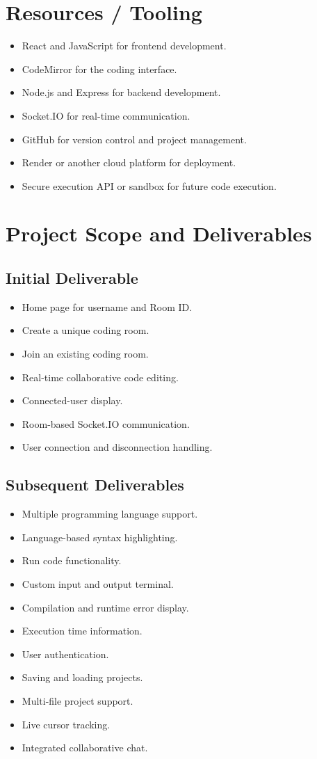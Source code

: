 \documentclass[11pt,letterpaper]{article}
\begin{document}
\section{Resources / Tooling}
\begin{itemize}
\item React and JavaScript for frontend development.
\item CodeMirror for the coding interface.
\item Node.js and Express for backend development.
\item Socket.IO for real-time communication.
\item GitHub for version control and project management.
\item Render or another cloud platform for deployment.
\item Secure execution API or sandbox for future code execution.
\end{itemize}


\section{Project Scope and Deliverables}
\subsection{Initial Deliverable}
\begin{itemize}
\item Home page for username and Room ID.
\item Create a unique coding room.
\item Join an existing coding room.
\item Real-time collaborative code editing.
\item Connected-user display.
\item Room-based Socket.IO communication.
\item User connection and disconnection handling.
\end{itemize}

\subsection{Subsequent Deliverables}
\begin{itemize}
\item Multiple programming language support.
\item Language-based syntax highlighting.
\item Run code functionality.
\item Custom input and output terminal.
\item Compilation and runtime error display.
\item Execution time information.
\item User authentication.
\item Saving and loading projects.
\item Multi-file project support.
\item Live cursor tracking.
\item Integrated collaborative chat.
\end{itemize}
\end{document}
